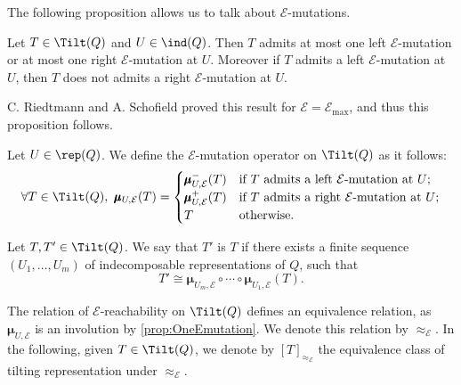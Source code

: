 The following proposition allows us to talk about $\mathcal{E}$-mutations.

\begin{prop} \label{prop:OneEmutation}
    Let $T \in \Tilt(Q)$ and $U \in \ind(Q)$. Then $T$ admits at most one left $\mathcal{E}$-mutation or at most one right $\mathcal{E}$-mutation at $U$. Moreover if $T$ admits a left $\mathcal{E}$-mutation at $U$, then $T$ does not admits a right $\mathcal{E}$-mutation at $U$.
\end{prop}

\begin{remark} \label{rem:RS}
C. Riedtmann and A. Schofield \cite{RS91} proved this result for $\mathcal{E} = \mathcal{E}_{\max}$, and thus this proposition follows. 
\end{remark}

\begin{definition} \label{def:Emut}
    Let $U \in \rep(Q)$. We define the $\mathcal{E}$-mutation operator on $\Tilt(Q)$ as it follows:
    \[\forall T \in \Tilt(Q),\ \pmb{\mu}_{U,\mathcal{E}}(T) = \begin{cases}
        \pmb{\mu}_{U,\mathcal{E}}^{-}(T) & \text{if } T \text{ admits a left } \mathcal{E}\text{-mutation at } U; \\
        \pmb{\mu}_{U,\mathcal{E}}^{+}(T) & \text{if } T \text{ admits a right } \mathcal{E}\text{-mutation at } U; \\
        T & \text{otherwise.}
    \end{cases}\]
\end{definition}

\begin{definition} \label{def:Ereachable}
Let $T,T' \in \Tilt(Q)$. We say that $T'$ is  $T$ if there exists a finite sequence $(U_1, \ldots, U_m)$ of indecomposable representations of $Q$, such that \[T' \cong \pmb{\mu}_{U_m,\mathcal{E}} \circ \cdots \circ \pmb{\mu}_{U_1,\mathcal{E}} (T).\] 
\end{definition}

The relation of $\mathcal{E}$-reachability on $\Tilt(Q)$ defines an equivalence relation, as $\pmb{\mu}_{U,\mathcal{E}}$ is an involution by \cref{prop:OneEmutation}. We denote this relation by $\approx_\mathcal{E}$. In the following, given $T \in \Tilt(Q)$, we denote by $[T]_{\approx_\mathcal{E}}$ the equivalence class of tilting representation under $\approx_\mathcal{E}$.

